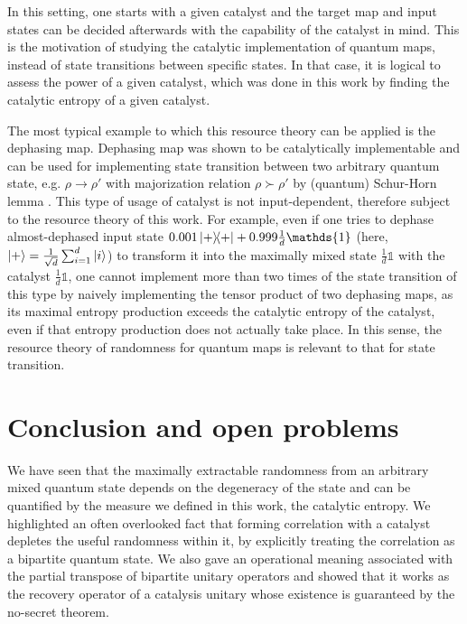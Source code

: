 \documentclass[aps, reprint, amsmath,amssymb, prx, superscriptaddress]{revtex4-2}
\begin{document}
In this setting, one starts with a given catalyst and the target map and input states can be decided afterwards with the capability of the catalyst in mind. This is the motivation of studying the catalytic implementation of quantum maps, instead of state transitions between specific states. In that case, it is logical to assess the power of a given catalyst, which was done in this work by finding the catalytic entropy of a given catalyst.

The most typical example to which this resource theory can be applied is the dephasing map. Dephasing map was shown to be catalytically implementable \cite{boes2018catalytic} and can be used for implementing state transition between two arbitrary quantum state, e.g. $\rho \to \rho'$ with majorization relation $\rho \succ \rho'$ by (quantum) Schur-Horn lemma \cite{scharlau2018quantum, horn1954doubly, schur1923uber, wilming2020entropy}. This type of usage of catalyst is not input-dependent, therefore subject to the resource theory of this work. For example, even if one tries to dephase almost-dephased input state $0.001 \dyad{+}+0.999\frac{1}{d}\mathds{1}$ (here, $\ket{+}=\frac{1}{\sqrt{d}}\sum_{i=1}^d\ket{i}$) to transform it into the maximally mixed state $\frac{1}{d}\mathds{1}$ with the catalyst $\frac{1}{d}\mathds{1}$, one cannot implement more than two times of the state transition of this type by naively implementing the tensor product of two dephasing maps, as its maximal entropy production exceeds the catalytic entropy of the catalyst, even if that entropy production does not actually take place.  In this sense, the resource theory of randomness for quantum maps is relevant to that for state transition.


\section{Conclusion and open problems}
We have seen that the maximally extractable randomness from an arbitrary mixed quantum state depends on the degeneracy of the state and can be quantified by the measure we defined in this work, the catalytic entropy. We highlighted an often overlooked fact that forming correlation with a catalyst depletes the useful randomness within it, by explicitly treating the correlation as a bipartite quantum state. We also gave an operational meaning associated with the partial transpose of bipartite unitary operators and showed that it works as the recovery operator of a catalysis unitary whose existence is guaranteed by the no-secret theorem.
\end{document}
